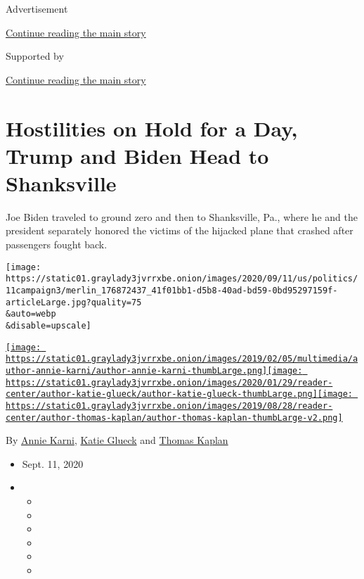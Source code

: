 Advertisement

\protect\hyperlink{after-top}{Continue reading the main story}

Supported by

\protect\hyperlink{after-sponsor}{Continue reading the main story}

\hypertarget{hostilities-on-hold-for-a-day-trump-and-biden-head-to-shanksville}{%
\section{Hostilities on Hold for a Day, Trump and Biden Head to
Shanksville}\label{hostilities-on-hold-for-a-day-trump-and-biden-head-to-shanksville}}

Joe Biden traveled to ground zero and then to Shanksville, Pa., where he
and the president separately honored the victims of the hijacked plane
that crashed after passengers fought back.

\texttt{[image: https://static01.graylady3jvrrxbe.onion/images/2020/09/11/us/politics/11campaign3/merlin\_176872437\_41f01bb1-d5b8-40ad-bd59-0bd95297159f-articleLarge.jpg?quality=75\\\&auto=webp\\\&disable=upscale]}

\href{https://www.nytimes3xbfgragh.onion/by/annie-karni}{\texttt{[image: https://static01.graylady3jvrrxbe.onion/images/2019/02/05/multimedia/author-annie-karni/author-annie-karni-thumbLarge.png]}}\href{https://www.nytimes3xbfgragh.onion/by/katie-glueck}{\texttt{[image: https://static01.graylady3jvrrxbe.onion/images/2020/01/29/reader-center/author-katie-glueck/author-katie-glueck-thumbLarge.png]}}\href{https://www.nytimes3xbfgragh.onion/by/thomas-kaplan}{\texttt{[image: https://static01.graylady3jvrrxbe.onion/images/2019/08/28/reader-center/author-thomas-kaplan/author-thomas-kaplan-thumbLarge-v2.png]}}

By \href{https://www.nytimes3xbfgragh.onion/by/annie-karni}{Annie
Karni}, \href{https://www.nytimes3xbfgragh.onion/by/katie-glueck}{Katie
Glueck} and
\href{https://www.nytimes3xbfgragh.onion/by/thomas-kaplan}{Thomas
Kaplan}

\begin{itemize}
\item
  Sept. 11, 2020
\item
  \begin{itemize}
  \item
  \item
  \item
  \item
  \item
  \item
  \end{itemize}
\end{itemize}

